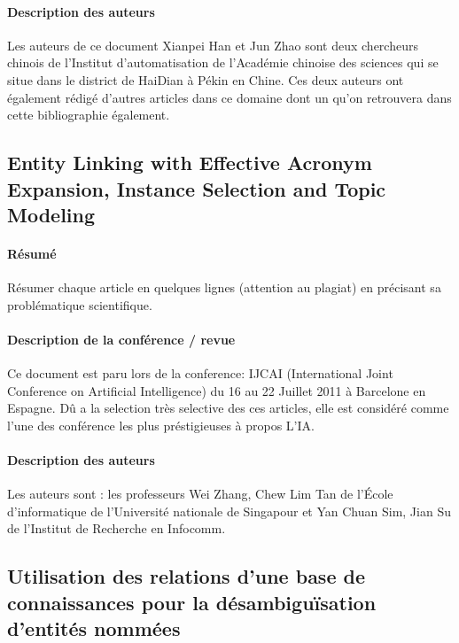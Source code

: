 \documentclass{article}
\begin{document}
\paragraph{Description des auteurs}
Les auteurs de ce document Xianpei Han et Jun Zhao sont deux chercheurs chinois de l'Institut d'automatisation de l'Académie chinoise des sciences qui se situe dans le district de HaiDian à Pékin en Chine. Ces deux auteurs ont également rédigé d'autres articles dans ce domaine dont un qu'on retrouvera dans cette bibliographie également.

\subsection{Entity Linking with Effective Acronym Expansion, Instance Selection and Topic Modeling\cite{inproceedings}}

\paragraph{Résumé}

Résumer chaque article en quelques lignes (attention au plagiat)
en précisant sa problématique scientifique.


\paragraph{Description de la conférence / revue}

Ce document est paru lors de la conference: IJCAI (International Joint Conference on Artificial Intelligence) du 16 au 22 Juillet 2011 à Barcelone en Espagne. Dû a la selection très selective des ces articles, elle est considéré comme l'une des conférence les plus préstigieuses à propos L'IA.

\paragraph{Description des auteurs}

Les auteurs sont : les professeurs Wei Zhang, Chew Lim Tan de l'École d'informatique de l'Université nationale de Singapour et Yan Chuan Sim, Jian Su de l'Institut de Recherche en Infocomm.

\subsection{Utilisation des relations d’une base de connaissances pour la désambiguïsation d’entités nommées\cite{article-9}}
\end{document}
